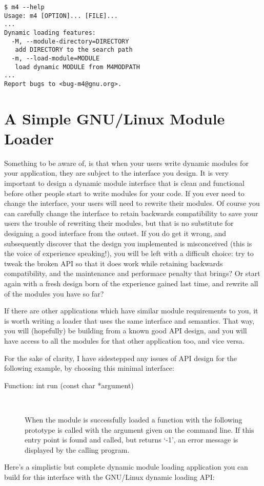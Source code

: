 \begin{Verbatim}[frame=single]
$ m4 --help
Usage: m4 [OPTION]... [FILE]...
...
Dynamic loading features:
  -M, --module-directory=DIRECTORY  
   add DIRECTORY to the search path
  -m, --load-module=MODULE          
   load dynamic MODULE from M4MODPATH
...
Report bugs to <bug-m4@gnu.org>.
\end{Verbatim}

\section{A Simple GNU/Linux Module Loader}

Something to be aware of, is that when your users write dynamic modules for your application, they are subject to the interface you design. It is very important to design a dynamic module interface that is clean and functional before other people start to write modules for your code. If you ever need to change the interface, your users will need to rewrite their modules. Of course you can carefully change the interface to retain backwards compatibility to save your users the trouble of rewriting their modules, but that is no substitute for designing a good interface from the outset. If you do get it wrong, and subsequently discover that the design you implemented is misconceived (this is the voice of experience speaking!), you will be left with a difficult choice: try to tweak the broken API so that it does work while retaining backwards compatibility, and the maintenance and performace penalty that brings? Or start again with a fresh design born of the experience gained last time, and rewrite all of the modules you have so far?

If there are other applications which have similar module requirements to you, it is worth writing a loader that uses the same interface and semantics. That way, you will (hopefully) be building from a known good API design, and you will have access to all the modules for that other application too, and vice versa.

For the sake of clarity, I have sidestepped any issues of API design for the following example, by choosing this minimal interface: 

\begin{description}
\item[Function: int run (const char *argument)]
\

    When the module is successfully loaded a function with the following prototype is called with the argument given on the command line. If this entry point is found and called, but returns `-1', an error message is displayed by the calling program.
\end{description}
Here's a simplistic but complete dynamic module loading application you can build for this interface with the GNU/Linux dynamic loading API:

